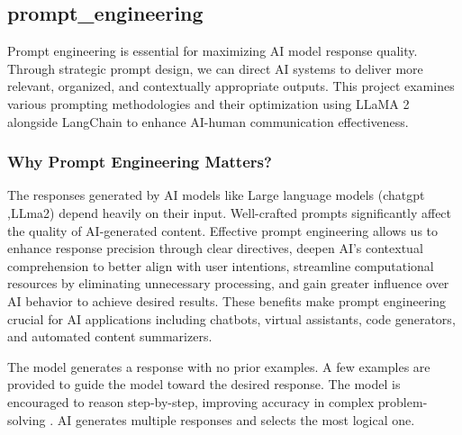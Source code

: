 \subsection{prompt_engineering}
Prompt engineering is essential for maximizing AI model response quality. Through strategic prompt 
design, we can direct AI systems to deliver more relevant, organized, and contextually appropriate 
outputs. This project examines various prompting methodologies and their optimization using LLaMA 
2 alongside LangChain to enhance AI-human communication effectiveness.

\subsubsection{Why Prompt Engineering Matters?}
The responses generated by AI models like Large language models (chatgpt ,LLma2) depend heavily on their input. Well-crafted 
prompts significantly affect the quality of AI-generated content. Effective prompt engineering allows 
us to enhance response precision through clear directives, deepen AI's contextual comprehension to 
better align with user intentions, streamline computational resources by eliminating unnecessary 
processing, and gain greater influence over AI behavior to achieve desired results. These benefits 
make prompt engineering crucial for AI applications including chatbots, virtual assistants, code 
generators, and automated content summarizers. 

The model generates a response with no prior examples.
A few examples are provided to guide the model toward the desired response.
The model is encouraged to reason step-by-step, improving accuracy in complex problem-solving \cite{wei2022chain}.
AI generates multiple responses and selects the most logical one.



